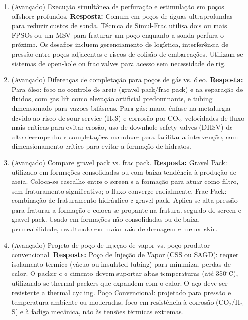 \documentclass[11pt,a4paper]{article}
\begin{document}
\begin{enumerate}
  \item (Avançado) Execução simultânea de perfuração e estimulação em poços offshore profundos.
  \textbf{Resposta:} Comum em poços de águas ultraprofundas para reduzir custos de sonda. Técnica de Simul-Frac utiliza dois ou mais FPSOs ou um MSV para fraturar um poço enquanto a sonda perfura o próximo. Os desafios incluem gerenciamento de logística, interferência de pressão entre poços adjacentes e riscos de colisão de embarcações. Utilizam-se sistemas de open-hole ou frac valves para acesso sem necessidade de rig.

  \item (Avançado) Diferenças de completação para poços de gás vs. óleo.
  \textbf{Resposta:} Para óleo: foco no controle de areia (gravel pack/frac pack) e na separação de fluidos, com gas lift como elevação artificial predominante, e tubing dimensionado para vazões bifásicas. Para gás: maior ênfase na metalurgia devido ao risco de sour service (H$_2$S) e corrosão por CO$_2$, velocidades de fluxo mais críticas para evitar erosão, uso de downhole safety valves (DHSV) de alto desempenho e completações monobore para facilitar a intervenção, com dimensionamento crítico para evitar a formação de hidratos.

  \item (Avançado) Compare gravel pack vs. frac pack.
  \textbf{Resposta:} Gravel Pack: utilizado em formações consolidadas ou com baixa tendência à produção de areia. Coloca-se cascalho entre o screen e a formação para atuar como filtro, sem fraturamento significativo; o fluxo converge radialmente. Frac Pack: combinação de fraturamento hidráulico e gravel pack. Aplica-se alta pressão para fraturar a formação e coloca-se propante na fratura, seguido do screen e gravel pack. Usado em formações não consolidadas ou de baixa permeabilidade, resultando em maior raio de drenagem e menor skin.

  \item (Avançado) Projeto de poço de injeção de vapor vs. poço produtor convencional.
  \textbf{Resposta:} Poço de Injeção de Vapor (CSS ou SAGD): requer isolamento térmico (vácuo ou insulated tubing) para minimizar perdas de calor. O packer e o cimento devem suportar altas temperaturas (até 350$^\circ$C), utilizando-se thermal packers que expandem com o calor. O aço deve ser resistente a thermal cycling. Poço Convencional: projetado para pressão e temperatura ambiente ou moderadas, foco em resistência à corrosão (CO$_2$/H$_2$S) e à fadiga mecânica, não às tensões térmicas extremas.


\end{enumerate}
\end{document}
